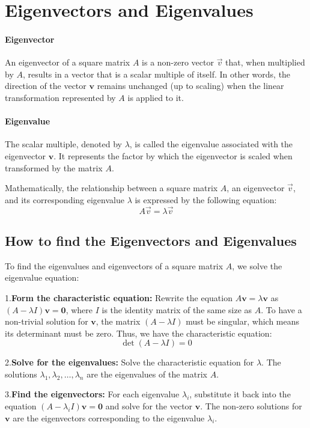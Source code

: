 \section{Eigenvectors and Eigenvalues}

\paragraph{Eigenvector}
An eigenvector of a square matrix \(A\) is a non-zero vector \(\vec{v}\) that, when multiplied by \(A\), results in a vector that is a scalar multiple of itself. In other words, the direction of the vector \(\mathbf{v}\) remains unchanged (up to scaling) when the linear transformation represented by \(A\) is applied to it.

\paragraph{Eigenvalue}
The scalar multiple, denoted by \(\lambda\), is called the eigenvalue associated with the eigenvector \(\mathbf{v}\). It represents the factor by which the eigenvector is scaled when transformed by the matrix \(A\).

Mathematically, the relationship between a square matrix \(A\), an eigenvector \(\vec{v}\), and its corresponding eigenvalue \(\lambda\) is expressed by the following equation:
\[
A\vec{v} = \lambda\vec{v}
\]

\subsection{How to find the Eigenvectors and Eigenvalues}

To find the eigenvalues and eigenvectors of a square matrix \(A\), we solve the eigenvalue equation:

 1.\textbf{Form the characteristic equation:}
    Rewrite the equation \(A\mathbf{v} = \lambda\mathbf{v}\) as \((A - \lambda I)\mathbf{v} = \mathbf{0}\), where \(I\) is the identity matrix of the same size as \(A\). To have a non-trivial solution for \(\mathbf{v}\), the matrix \((A - \lambda I)\) must be singular, which means its determinant must be zero. Thus, we have the characteristic equation:
    \[
    \det(A - \lambda I) = 0
    \]

 2.\textbf{Solve for the eigenvalues:}
    Solve the characteristic equation for \(\lambda\). The solutions \(\lambda_1, \lambda_2, \dots, \lambda_n\) are the eigenvalues of the matrix \(A\).

 3.\textbf{Find the eigenvectors:}
    For each eigenvalue \(\lambda_i\), substitute it back into the equation \((A - \lambda_i I)\mathbf{v} = \mathbf{0}\) and solve for the vector \(\mathbf{v}\). The non-zero solutions for \(\mathbf{v}\) are the eigenvectors corresponding to the eigenvalue \(\lambda_i\).

